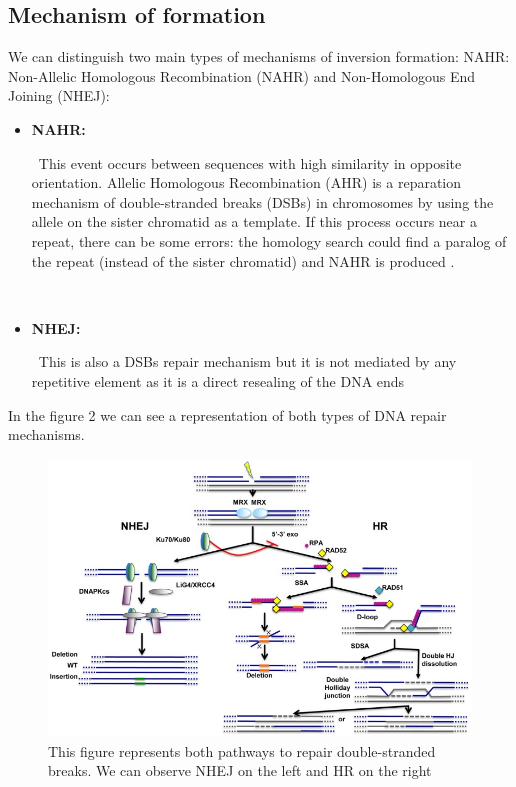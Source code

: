 \documentclass[a4paper,12pt]{article}
\begin{document}
\subsection{Mechanism of formation}
We can distinguish two main types of mechanisms of inversion formation: NAHR: Non-Allelic Homologous Recombination (NAHR) and Non-Homologous End Joining (NHEJ):

\begin{itemize}
    \item {\bf NAHR:} 
    
    \
    This event occurs between sequences with high similarity in opposite orientation. Allelic Homologous Recombination (AHR) is a reparation mechanism of  double-stranded breaks (DSBs) in chromosomes by using the allele on the sister chromatid as a template. If this process occurs near a repeat, there can be some errors: the homology search could find a paralog of the repeat (instead of the sister chromatid) and NAHR is produced \cite{parks_detecting_2015}.
    
    \
    \item{\bf NHEJ:}
    
    \
    This is also a DSBs repair mechanism but it is not mediated by any repetitive element as it is a direct resealing of the DNA ends \cite{decottignies_alternative_2013}
\end{itemize}

In the figure 2 we can see a representation of both types of DNA repair mechanisms.
\begin{figure}[!htb]
    \centering
    \includegraphics[scale=5]{figures/mechanisms.jpg}
    \caption{This figure \cite{decottignies_alternative_2013} represents both pathways to repair double-stranded breaks. We can observe NHEJ on the left and HR on the right}
    \label{fig:pathways}
\end{figure}
\end{document}
